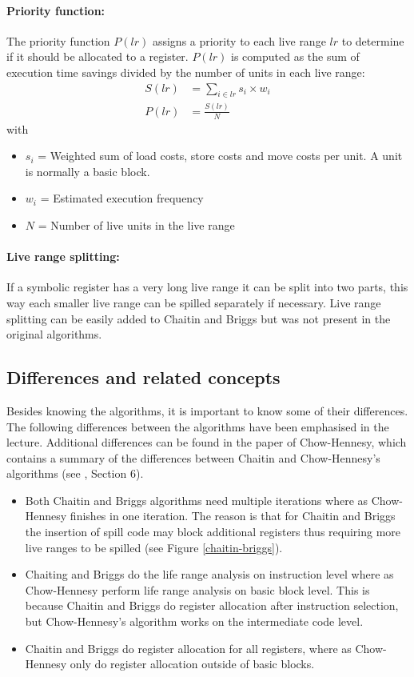 \documentclass[a4paper,10pt]{article}
\begin{document}
\paragraph{Priority function:} The priority function $P(lr)$ assigns a priority to each live range $lr$ to determine if it should be 
allocated to a register. $P(lr)$ is computed as the sum of execution time savings divided by the number of units in each live range:
\begin{align}
 S(lr) &= \sum_{i\in lr}{s_i \times w_i}\\
 P(lr) &= \frac{S(lr)}{N}
\end{align}
with
\begin{itemize}
 \item $s_i$ = Weighted sum of load costs, store costs and move costs per unit. A unit is normally a basic block.
 \item $w_i$ = Estimated execution frequency
 \item $N$ = Number of live units in the live range
\end{itemize}

\paragraph{Live range splitting:} If a symbolic register has a very long live range it can be split into two parts, this way each smaller 
live range can be spilled separately if necessary. Live range splitting can be easily added to Chaitin and Briggs but was not present in 
the original algorithms.

\subsection{Differences and related concepts}
Besides knowing the algorithms, it is important to know some of their differences. The following differences between the algorithms have 
been emphasised in the lecture. Additional differences can be found in the paper of Chow-Hennesy, which contains a summary of the 
differences between Chaitin and Chow-Hennesy's algorithms (see \cite{chowhennesy}, Section 6).

\begin{itemize}
 \item Both Chaitin and Briggs algorithms need multiple iterations where as Chow-Hennesy finishes in one iteration. The reason is that
       for Chaitin and Briggs the insertion of spill code may block additional registers thus requiring more live ranges to be spilled 
       (see Figure \ref{chaitin-briggs}).
 \item Chaiting and Briggs do the life range analysis on instruction level where as Chow-Hennesy perform life range analysis 
       on basic block level. This is because Chaitin and Briggs do register allocation after instruction selection, but Chow-Hennesy's 
       algorithm works on the intermediate code level.
 \item Chaitin and Briggs do register allocation for all registers, where as Chow-Hennesy only do register allocation outside of basic 
       blocks.
\end{itemize}
\end{document}
